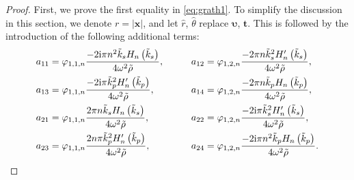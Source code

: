 \documentclass[11pt,reqno,twoside]{amsart}
\theoremstyle{definition}
\theoremstyle{remark}
\numberwithin{equation}{section}
\newcommand{\bx}{\mathbf{x}}
\begin{document}
\begin{proof}
	First, we prove the first equality in \eqref{eq:grath1}. To simplify the discussion in this section, we denote $r=|\bx|$, and let  $\hat{r}$, $\hat{\theta}$ replace $\bm{\upsilon}$, $\bm{t}$. This is followed by the introduction of the following additional terms:
	\begin{align}
		a_{11} &=\varphi _{1,1,n}\frac{-2\mathrm{i} \pi   n^2 \tilde{k}_{s}  H_n\left(\tilde{k}_{s}  \right)}{4 \omega ^2\tilde{\rho}},\qquad 
		&a_{12} &=\varphi  _{1,2,n}\frac{-2\pi   n \tilde{k}_{s} ^2  H_n'\left(\tilde{k}_{s} \right)}{4 \omega ^2\tilde{\rho}},\label{eq:ure}\\
		a_{13}&=\varphi  _{1,1,n}\frac{-2\mathrm{i} \pi   \tilde{k}_{p} ^2  H_n'\left(\tilde{k}_{p} \right)}{4 \omega ^2\tilde{\rho}},\qquad 
		&a_{14}&=\varphi  _{1,2,n}\frac{-2\pi   n \tilde{k}_{p}   H_n\left(\tilde{k}_{p} \right)}{4 \omega ^2\tilde{\rho}} ,\notag \\
		a_{21}&=\varphi  _{1,1,n}\frac{2 \pi   n \tilde{k}_{s}  H_n\left(\tilde{k}_{s}  \right)}{4 \omega ^2\tilde{\rho}},\qquad
		&a_{22}&=\varphi  _{1,2,n}\frac{-2\mathrm{i}\pi    \tilde{k}_{s} ^2  H_n'\left(\tilde{k}_{s} \right)}{4 \omega ^2\tilde{\rho}},\notag\\
		a_{23}&=\varphi  _{1,1,n}\frac{2n \pi   \tilde{k}_{p} ^2  H_n'\left(\tilde{k}_{p} \right)}{4 \omega ^2\tilde{\rho}},\qquad
		&a_{24}&=\varphi  _{1,2,n}\frac{-2\mathrm{i}\pi   n^2 \tilde{k}_{p}   H_n\left(\tilde{k}_{p} \right)}{4 \omega ^2\tilde{\rho}}.\notag
	\end{align}
	

\end{proof}
\end{document}

